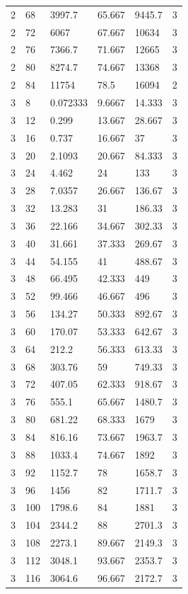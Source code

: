 \begin{tabular}{|p{0.6cm}|p{0.5cm}|p{1.15cm}|p{1cm}|p{1cm}|p{0.7cm}|}
2 & 68 & 3997.7 & 65.667 & 9445.7 & 3 \\
2 & 72 & 6067 & 67.667 & 10634 & 3 \\
2 & 76 & 7366.7 & 71.667 & 12665 & 3 \\
2 & 80 & 8274.7 & 74.667 & 13368 & 3 \\
2 & 84 & 11754 & 78.5 & 16094 & 2 \\
3 & 8 & 0.072333 & 9.6667 & 14.333 & 3 \\
3 & 12 & 0.299 & 13.667 & 28.667 & 3 \\
3 & 16 & 0.737 & 16.667 & 37 & 3 \\
3 & 20 & 2.1093 & 20.667 & 84.333 & 3 \\
3 & 24 & 4.462 & 24 & 133 & 3 \\
3 & 28 & 7.0357 & 26.667 & 136.67 & 3 \\
3 & 32 & 13.283 & 31 & 186.33 & 3 \\
3 & 36 & 22.166 & 34.667 & 302.33 & 3 \\
3 & 40 & 31.661 & 37.333 & 269.67 & 3 \\
3 & 44 & 54.155 & 41 & 488.67 & 3 \\
3 & 48 & 66.495 & 42.333 & 449 & 3 \\
3 & 52 & 99.466 & 46.667 & 496 & 3 \\
3 & 56 & 134.27 & 50.333 & 892.67 & 3 \\
3 & 60 & 170.07 & 53.333 & 642.67 & 3 \\
3 & 64 & 212.2 & 56.333 & 613.33 & 3 \\
3 & 68 & 303.76 & 59 & 749.33 & 3 \\
3 & 72 & 407.05 & 62.333 & 918.67 & 3 \\
3 & 76 & 555.1 & 65.667 & 1480.7 & 3 \\
3 & 80 & 681.22 & 68.333 & 1679 & 3 \\
3 & 84 & 816.16 & 73.667 & 1963.7 & 3 \\
3 & 88 & 1033.4 & 74.667 & 1892 & 3 \\
3 & 92 & 1152.7 & 78 & 1658.7 & 3 \\
3 & 96 & 1456 & 82 & 1711.7 & 3 \\
3 & 100 & 1798.6 & 84 & 1881 & 3 \\
3 & 104 & 2344.2 & 88 & 2701.3 & 3 \\
3 & 108 & 2273.1 & 89.667 & 2149.3 & 3 \\
3 & 112 & 3048.1 & 93.667 & 2353.7 & 3 \\
3 & 116 & 3064.6 & 96.667 & 2172.7 & 3 \\

\end{tabular}
